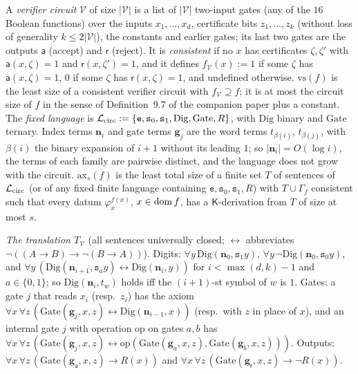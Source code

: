 A \emph{verifier circuit} $\mathcal V$ of size $\lvert\mathcal V\rvert$ is a list of $\lvert\mathcal V\rvert$ two-input gates (any of the $16$ Boolean functions) over the inputs $x_1,\dots,x_d$, certificate bits $z_1,\dots,z_k$ (without loss of generality $k\le2\lvert\mathcal V\rvert$), the constants and earlier gates; its last two gates are the outputs $\mathsf a$ (accept) and $\mathsf r$ (reject). It is \emph{consistent} if no $x$ has certificates $\zeta,\zeta'$ with $\mathsf a(x,\zeta)=1$ and $\mathsf r(x,\zeta')=1$, and it defines $f_{\mathcal V}(x):=1$ if some $\zeta$ has $\mathsf a(x,\zeta)=1$, $0$ if some $\zeta$ has $\mathsf r(x,\zeta)=1$, and undefined otherwise. $\mathrm{vs}(f)$ is the least size of a consistent verifier circuit with $f_{\mathcal V}\supseteq f$; it is at most the circuit size of $f$ in the sense of Definition~9.7 of the companion paper plus a constant. The \emph{fixed language} is $\mathcal L_{\rm circ}:=\{\mathtt e,\mathtt s_0,\mathtt s_1,\mathrm{Dig},\mathrm{Gate},R\}$, with $\mathrm{Dig}$ binary and $\mathrm{Gate}$ ternary. Index terms $\mathbf n_i$ and gate terms $\mathbf g_j$ are the word terms $t_{\beta(i)}$, $t_{\beta(j)}$, with $\beta(i)$ the binary expansion of $i+1$ without its leading $1$; so $\lvert\mathbf n_i\rvert=O(\log i)$, the terms of each family are pairwise distinct, and the language does not grow with the circuit. $\mathrm{ax}_s(f)$ is the least total size of a finite set $T$ of sentences of $\mathcal L_{\rm circ}$ (or of any fixed finite language containing $\mathtt e,\mathtt s_0,\mathtt s_1,R$) with $T\cup\Gamma_f$ consistent such that every datum $\varphi_x^{f(x)}$, $x\in\operatorname{dom} f$, has a $\mathsf K$-derivation from $T$ of size at most $s$.

\emph{The translation $T_{\mathcal V}$} (all sentences universally closed; $\leftrightarrow$ abbreviates $\neg((A\to B)\to\neg(B\to A))$). Digits: $\forall y\,\mathrm{Dig}(\mathbf n_0,\mathtt s_1y)$, $\forall y\,\neg\mathrm{Dig}(\mathbf n_0,\mathtt s_0y)$, and $\forall y\,(\mathrm{Dig}(\mathbf n_{i+1},\mathtt s_ay)\leftrightarrow\mathrm{Dig}(\mathbf n_i,y))$ for $i<\max(d,k)-1$ and $a\in\{0,1\}$; so $\mathrm{Dig}(\mathbf n_i,t_w)$ holds iff the $(i+1)$-st symbol of $w$ is $1$. Gates: a gate $j$ that reads $x_i$ (resp.\ $z_i$) has the axiom $\forall x\,\forall z\,(\mathrm{Gate}(\mathbf g_j,x,z)\leftrightarrow\mathrm{Dig}(\mathbf n_{i-1},x))$ (resp.\ with $z$ in place of $x$), and an internal gate $j$ with operation $\mathrm{op}$ on gates $a,b$ has $\forall x\,\forall z\,(\mathrm{Gate}(\mathbf g_j,x,z)\leftrightarrow\mathrm{op}(\mathrm{Gate}(\mathbf g_a,x,z),\mathrm{Gate}(\mathbf g_b,x,z)))$. Outputs: $\forall x\,\forall z\,(\mathrm{Gate}(\mathbf g_{\mathsf a},x,z)\to R(x))$ and $\forall x\,\forall z\,(\mathrm{Gate}(\mathbf g_{\mathsf r},x,z)\to\neg R(x))$.

